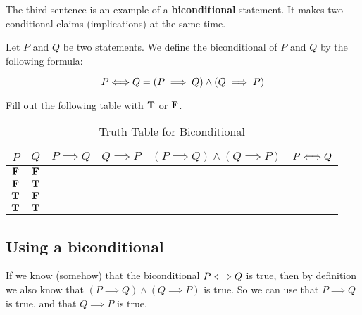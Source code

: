 The third sentence is an example of a \textbf{biconditional} statement.  It makes two conditional claims  (implications) at the same time. 

\begin{definition}
	 	Let $P$ and $Q$ be two statements.  We define the biconditional of $P$ and $Q$ by the following formula:
	 	
	 	\[
	 	P \Longleftrightarrow Q = (P \implies Q) \wedge (Q \implies P)
	 	\]
	\end{definition}

\begin{xca}
	Fill out the following table with $\textbf{\textrm{T}}$ or $\textbf{\textrm{F}}$.


	\begin{table}[h!]
	\begin{center}
		\caption{Truth Table for Biconditional}
		\begin{tabular}{c|c|c|c|c|c} 
			$P$ & $Q$ & $P \implies Q$ & $Q \implies P$ & $(P \implies Q) \wedge (Q \implies P)$ & $P \Longleftrightarrow Q$ \\
						\hline
			$\textbf{\textrm{F}}$ & $\textbf{\textrm{F}}$ &  & &  & \\
						\hline
			$\textbf{\textrm{F}}$ & $\textbf{\textrm{T}}$ &  & &  & \\
						\hline
			$\textbf{\textrm{T}}$ & $\textbf{\textrm{F}}$ &  & &  & \\
						\hline
			$\textbf{\textrm{T}}$ & $\textbf{\textrm{T}}$ &  & &  & \\
		\end{tabular}
	\end{center}
\end{table}
\end{xca}

\subsection{Using a biconditional} 

If we know (somehow) that the biconditional $P \Longleftrightarrow Q$ is true, then by definition we also know that $(P \implies Q) \wedge (Q \implies P)$ is true.  So we can use that $P \implies Q$ is true, and that $Q \implies P$ is true.  


